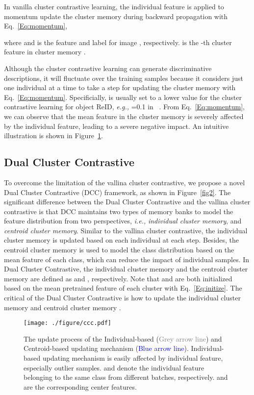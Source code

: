 \documentclass[10pt,twocolumn,letterpaper]{article}
\begin{document}
In vanilla cluster contrastive learning, the individual feature is applied to momentum update the cluster memory  during backward propagation with Eq.~\eqref{Eq:momentum},

where  and  is the feature and label for image , respectively. 
 is the -th cluster feature in cluster memory .

Although the cluster contrastive learning can generate discriminative descriptions, it will fluctuate over the training samples because it considers just one individual at a time to take a step for updating the cluster memory with Eq.~\eqref{Eq:momentum}. 
Specificially,  is usually set to a lower value for the cluster contrastive learning for object ReID, \emph{e.g.,}  =0.1 in ~\cite{dai2021cluster}.
From Eq.~\eqref{Eq:momentum}, we can observe that the mean feature in the cluster memory  is severely affected by the individual feature, leading to a severe negative impact.  
An intuitive illustration is shown in Figure~\ref{fig:ccc}.

\subsection{Dual Cluster Contrastive}
To overcome the limitation of the vallina cluster contrastive, we propose a novel Dual Cluster Contrastive (DCC) framework, as shown in Figure~\ref{fig2}.
The significant difference between the Dual Cluster Contrastive and the vallina cluster contrastive is that DCC maintains two types of memory banks to model the feature distribution from two perspectives, \emph{i.e.,} \emph{individual cluster memory}, and \emph{centroid cluster memory}. 
Similar to the vallina cluster contrastive, the individual cluster memory is updated based on each individual at each step.
Besides, the centroid cluster memory is used to model the class distribution based on the mean feature of each class, which can reduce the impact of individual samples.
In Dual Cluster Contrastive, the individual cluster memory and the centroid cluster memory are defined as  and , respectively.
Note that  and  are both initialized based on the mean pretrained feature of each cluster with Eq.~\eqref{Eq:initize}.
The critical of the Dual Cluster Contrastive is how to update the individual cluster memory  and centroid cluster memory .

\begin{figure}
  \centering
   \texttt{[image: ./figure/ccc.pdf]}
   \caption{\small The update process of the Individual-based (\textcolor{Grey}{Grey arrow line}) and Centroid-based updating mechanism (\textcolor{blue}{Blue arrow line}). Individual-based updating mechanism is easily affected by individual feature, especially outlier samples. \textcolor{red}{} and  \textcolor{green}{} denote the individual feature belonging to the same class from different batches, respectively. \textcolor{red}{} and  \textcolor{green}{} are the corresponding center features.}
   \label{fig:ccc}
\end{figure}
\end{document}
